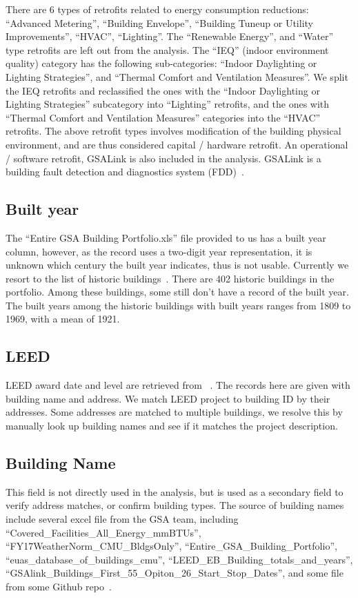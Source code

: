 \documentclass[12pt]{article}
\begin{document}
There are 6 types of retrofits related to energy consumption reductions:
``Advanced Metering'', ``Building Envelope'', ``Building Tuneup or Utility
Improvements'', ``HVAC'', ``Lighting''. The ``Renewable Energy'', and ``Water''
type retrofits are left out from the analysis. The ``IEQ'' (indoor environment
quality) category has the following sub-categories: ``Indoor Daylighting or
Lighting Strategies'', and ``Thermal Comfort and Ventilation Measures''. We
split the IEQ retrofits and reclassified the ones with the ``Indoor Daylighting
or Lighting Strategies'' subcategory into ``Lighting'' retrofits, and the ones
with ``Thermal Comfort and Ventilation Measures'' categories into the ``HVAC''
retrofits. The above retrofit types involves modification of the building
physical environment, and are thus considered capital / hardware retrofit. An
operational / software retrofit, GSALink is also included in the analysis.
GSALink is a building fault detection and diagnostics system (FDD)~\cite{intelligentBuildings2019}.

\subsection{Built year}
The ``Entire GSA Building Portfolio.xls'' file provided to us has a built year
column, however, as the record uses a two-digit year representation, it is
unknown which century the built year indicates, thus is not usable. Currently we
resort to the list of historic buildings~\cite{GSAhistoricBuilding2020}. There
are 402 historic buildings in the portfolio. Among these buildings, some still
don't have a record of the built year. The built years among the historic
buildings with built years ranges from 1809 to 1969, with a mean of 1921.

\subsection{LEED}
LEED award date and level are retrieved from ~\cite{GBIG2020}. The records here
are given with building name and address. We match LEED project to building ID
by their addresses. Some addresses are matched to multiple buildings, we resolve
this by manually look up building names and see if it matches the project
description.

\subsection{Building Name} This field is not directly used in the analysis, but
is used as a secondary field to verify address matches, or confirm building
types. The source of building names include several excel file from the GSA
team, including ``Covered\_Facilities\_All\_Energy\_mmBTUs'',
``FY17WeatherNorm\_CMU\_BldgsOnly'', ``Entire\_GSA\_Building\_Portfolio'',
``euas\_database\_of\_buildings\_cmu'', ``LEED\_EB\_Building\_totals\_and\_years'',
``GSAlink\_Buildings\_First\_55\_Opiton\_26\_Start\_Stop\_Dates'', and some file from
some Github repo~\cite{gsaHackathon2015}.
\end{document}
